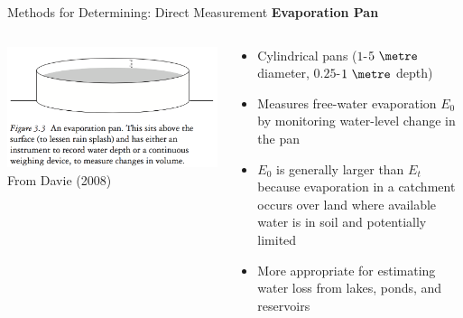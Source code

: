 
\begin{frame}{Methods for Determining: Direct Measurement}
\textbf{Evaporation Pan}
\begin{columns}[T]
    \begin{column}{.4\textwidth}
    \begin{minipage}[c][0.7\textheight][c]{\linewidth}
    \includegraphics[width=1\textwidth]{fig2}\\
    \centering \small From Davie (2008)
    \end{minipage}
    \end{column}
    \begin{column}{.6\textwidth}
    \begin{minipage}[c][0.6\textheight][c]{\linewidth}
   \begin{itemize}
   	\item Cylindrical pans ($1$-$5\ \metre$ diameter, $0.25$-$1\ \metre$ depth)
   	\item Measures free-water evaporation $E_0$ by monitoring water-level change in the pan
   	\item $E_0$ is generally larger than $E_t$ because evaporation in a catchment occurs over land where available water is in soil and potentially limited
   	\item More appropriate for estimating water loss from lakes, ponds, and reservoirs
   \end{itemize}
      \end{minipage}
    \end{column}
  \end{columns}
\end{frame}


